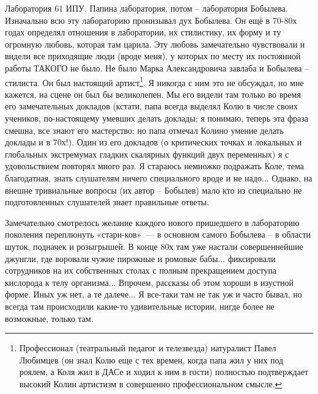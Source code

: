 Лаборатория 61 ИПУ. Папина лаборатория, потом – лаборатория Бобылева. Изначально всю эту лабораторию пронизывал дух Бобылева. Он ещё в 70-80х годах определял отношения в лаборатории, их стилистику, их форму и ту огромную любовь, которая там царила. Эту любовь замечательно чувствовали и видели все приходящие люди (вроде меня), у которых по месту их постоянной работы ТАКОГО не было. Не было Марка Александровича завлаба и Бобылева – стилиста. Он был настоящий артист\footnote{Профессионал (театральный педагог и телезвезда) натуралист Павел Любимцев (он знал Колю еще с тех времен, когда папа жил у них под роялем, а Коля жил в ДАСе и ходил к ним в гости) полностью подтверждает высокий Колин артистизм в совершенно профессиональном смысле.}. Я никогда с ним это не обсуждал, но мне кажется, на сцене он был бы великолепен. Мы его видели там только во время его замечательных докладов (кстати, папа всегда выделял Колю в числе своих учеников, по-настоящему умевших делать доклады; я понимаю, теперь эта фраза смешна, все знают его мастерство; но папа отмечал Колино умение делать доклады и в 70х!). Один из его докладов (о критических точках и локальных и глобальных экстремумах гладких скалярных функций двух переменных) я с удовольствием повторял много раз.  Я стараюсь немножко подражать Коле, тема благодатная, знать слушателям ничего специального вроде и не надо... Однако, на внешне тривиальные вопросы (их автор – Бобылев) мало кто из специально не подготовленных слушателей знает правильные ответы.

Замечательно смотрелось желание каждого нового пришедшего в лабораторию поколения переплюнуть
«стари-\linebreak ков»~---
в основном самого Бобылева – в области шуток, подначек и розыгрышей.
В конце 80х там уже настали совершеннейшие джунгли, где воровали чужие пирожные и ромовые бабы...
фиксировали сотрудников на их собственных столах с полным прекращением доступа кислорода к телу организма...
Впрочем, рассказы об этом хороши в изустной форме. Иных уж нет, а те далече...
Я все-таки там не так уж и часто бывал, но всегда там происходили какие-то удивительные истории,
нигде более не возможные, только там.

